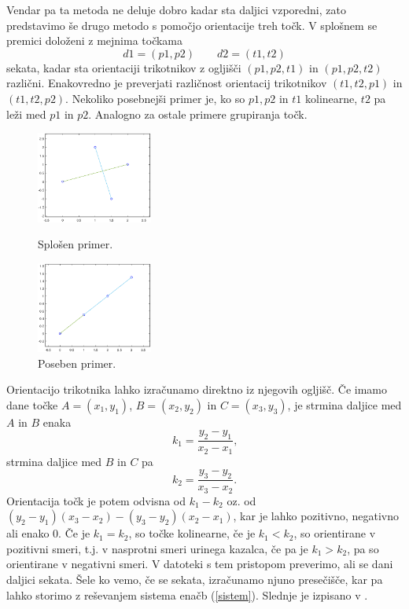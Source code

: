 \documentclass{article}
\begin{document}
Vendar pa ta metoda ne deluje 
dobro kadar sta daljici vzporedni, zato predstavimo še drugo metodo s pomočjo orientacije treh točk.
V splošnem se premici doloženi z mejnima točkama 
$$ d1 = (p1, p2) \qquad d2 = (t1, t2)$$
sekata, kadar sta orientaciji trikotnikov z ogljišči $(p1, p2, t1)$ in $(p1, p2, t2)$ različni. 
Enakovredno je preverjati različnost orientacij trikotnikov $(t1, t2, p1)$ in $(t1, t2, p2)$. 
Nekoliko posebnejši primer je, ko so $p1, p2$ in $t1$ kolinearne, $t2$ pa leži med $p1$ in $p2$.
Analogno za ostale primere grupiranja točk.
\begin{figure}[H]
    \centering
    \begin{minipage}{.5\textwidth}
        \centering
        \includegraphics[height = 3cm]{splosno_sekata.eps}
        \caption{Splošen primer.}
    \end{minipage}%
    \begin{minipage}{.5\textwidth}
        \centering
        \includegraphics[height = 3cm]{kolinearne.eps}
        \caption{Poseben primer.}
        \label{fig:napih}
    \end{minipage}
\end{figure}
Orientacijo trikotnika lahko izračunamo direktno iz njegovih ogljišč. Če imamo dane točke $A = (x_1, y_1)$,
$B = (x_2, y_2)$ in $C = (x_3, y_3)$, je strmina daljice med $A$ in $B$ enaka 
$$k_1 = \frac{y_2 - y_1}{x_2 - x_1}\text{,}$$ 
strmina daljice med $B$ in $C$ pa
$$k_2 = \frac{y_3 - y_2}{x_3 - x_2}\text{.}$$
Orientacija točk je potem odvisna od $k_1 - k_2$ oz. od $(y_2 - y_1) (x_3 - x_2) - (y_3 - y_2) (x_2 - x_1)$,
kar je lahko pozitivno, negativno ali enako $0$. Če je  $k_1 = k_2$, so točke kolinearne,
če je $k_1 < k_2$, so orientirane v pozitivni smeri, t.j. v nasprotni smeri urinega kazalca, če pa
je $k_1 > k_2$, pa so orientirane v negativni smeri. V datoteki  
s tem pristopom preverimo, ali se dani daljici sekata.
Šele ko vemo, če se sekata, izračunamo njuno presečišče, kar pa lahko storimo z reševanjem 
sistema enačb (\ref{sistem}). Slednje je izpisano v .
\end{document}
